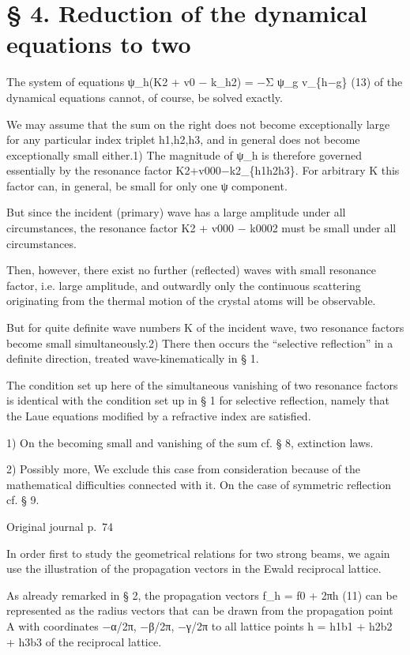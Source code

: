 \documentclass[10pt]{article}
\newcommand{\origpage}[1]{\par\medskip\noindent\hfill{\small\color{notegray}Original journal p.~#1}\hfill\mbox{}\par\smallskip}
\begin{document}
\section*{§ 4. Reduction of the dynamical equations to two}
The system of equations ψ\_h(K2 + v0 − k\_h2) = −Σ ψ\_g v\_\{h−g\} (13) of the dynamical equations cannot, of course, be solved exactly.\par
We may assume that the sum on the right does not become exceptionally large for any particular index triplet h1,h2,h3, and in general does not become exceptionally small either.1) The magnitude of ψ\_h is therefore governed essentially by the resonance factor K2+v000−k2\_\{h1h2h3\}. For arbitrary K this factor can, in general, be small for only one ψ component.\par
But since the incident (primary) wave has a large amplitude under all circumstances, the resonance factor K2 + v000 − k0002 must be small under all circumstances.\par
Then, however, there exist no further (reflected) waves with small resonance factor, i.e. large amplitude, and outwardly only the continuous scattering originating from the thermal motion of the crystal atoms will be observable.\par
But for quite definite wave numbers K of the incident wave, two resonance factors become small simultaneously.2) There then occurs the “selective reflection” in a definite direction, treated wave-kinematically in § 1.\par
The condition set up here of the simultaneous vanishing of two resonance factors is identical with the condition set up in § 1 for selective reflection, namely that the Laue equations modified by a refractive index are satisfied.\par
\noindent\footnotesize 1) On the becoming small and vanishing of the sum cf. § 8, extinction laws.\par\normalsize
\noindent\footnotesize 2) Possibly more, We exclude this case from consideration because of the mathematical difficulties connected with it. On the case of symmetric reflection cf. § 9.\par\normalsize
\origpage{74}
In order first to study the geometrical relations for two strong beams, we again use the illustration of the propagation vectors in the Ewald reciprocal lattice.\par
As already remarked in § 2, the propagation vectors f\_h = f0 + 2πh (11) can be represented as the radius vectors that can be drawn from the propagation point A with coordinates −α/2π, −β/2π, −γ/2π to all lattice points h = h1b1 + h2b2 + h3b3 of the reciprocal lattice.\par
\end{document}
